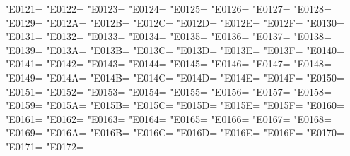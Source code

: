 \XeTeXcharclass"E0121=\KclassCM
\XeTeXcharclass"E0122=\KclassCM
\XeTeXcharclass"E0123=\KclassCM
\XeTeXcharclass"E0124=\KclassCM
\XeTeXcharclass"E0125=\KclassCM
\XeTeXcharclass"E0126=\KclassCM
\XeTeXcharclass"E0127=\KclassCM
\XeTeXcharclass"E0128=\KclassCM
\XeTeXcharclass"E0129=\KclassCM
\XeTeXcharclass"E012A=\KclassCM
\XeTeXcharclass"E012B=\KclassCM
\XeTeXcharclass"E012C=\KclassCM
\XeTeXcharclass"E012D=\KclassCM
\XeTeXcharclass"E012E=\KclassCM
\XeTeXcharclass"E012F=\KclassCM
\XeTeXcharclass"E0130=\KclassCM
\XeTeXcharclass"E0131=\KclassCM
\XeTeXcharclass"E0132=\KclassCM
\XeTeXcharclass"E0133=\KclassCM
\XeTeXcharclass"E0134=\KclassCM
\XeTeXcharclass"E0135=\KclassCM
\XeTeXcharclass"E0136=\KclassCM
\XeTeXcharclass"E0137=\KclassCM
\XeTeXcharclass"E0138=\KclassCM
\XeTeXcharclass"E0139=\KclassCM
\XeTeXcharclass"E013A=\KclassCM
\XeTeXcharclass"E013B=\KclassCM
\XeTeXcharclass"E013C=\KclassCM
\XeTeXcharclass"E013D=\KclassCM
\XeTeXcharclass"E013E=\KclassCM
\XeTeXcharclass"E013F=\KclassCM
\XeTeXcharclass"E0140=\KclassCM
\XeTeXcharclass"E0141=\KclassCM
\XeTeXcharclass"E0142=\KclassCM
\XeTeXcharclass"E0143=\KclassCM
\XeTeXcharclass"E0144=\KclassCM
\XeTeXcharclass"E0145=\KclassCM
\XeTeXcharclass"E0146=\KclassCM
\XeTeXcharclass"E0147=\KclassCM
\XeTeXcharclass"E0148=\KclassCM
\XeTeXcharclass"E0149=\KclassCM
\XeTeXcharclass"E014A=\KclassCM
\XeTeXcharclass"E014B=\KclassCM
\XeTeXcharclass"E014C=\KclassCM
\XeTeXcharclass"E014D=\KclassCM
\XeTeXcharclass"E014E=\KclassCM
\XeTeXcharclass"E014F=\KclassCM
\XeTeXcharclass"E0150=\KclassCM
\XeTeXcharclass"E0151=\KclassCM
\XeTeXcharclass"E0152=\KclassCM
\XeTeXcharclass"E0153=\KclassCM
\XeTeXcharclass"E0154=\KclassCM
\XeTeXcharclass"E0155=\KclassCM
\XeTeXcharclass"E0156=\KclassCM
\XeTeXcharclass"E0157=\KclassCM
\XeTeXcharclass"E0158=\KclassCM
\XeTeXcharclass"E0159=\KclassCM
\XeTeXcharclass"E015A=\KclassCM
\XeTeXcharclass"E015B=\KclassCM
\XeTeXcharclass"E015C=\KclassCM
\XeTeXcharclass"E015D=\KclassCM
\XeTeXcharclass"E015E=\KclassCM
\XeTeXcharclass"E015F=\KclassCM
\XeTeXcharclass"E0160=\KclassCM
\XeTeXcharclass"E0161=\KclassCM
\XeTeXcharclass"E0162=\KclassCM
\XeTeXcharclass"E0163=\KclassCM
\XeTeXcharclass"E0164=\KclassCM
\XeTeXcharclass"E0165=\KclassCM
\XeTeXcharclass"E0166=\KclassCM
\XeTeXcharclass"E0167=\KclassCM
\XeTeXcharclass"E0168=\KclassCM
\XeTeXcharclass"E0169=\KclassCM
\XeTeXcharclass"E016A=\KclassCM
\XeTeXcharclass"E016B=\KclassCM
\XeTeXcharclass"E016C=\KclassCM
\XeTeXcharclass"E016D=\KclassCM
\XeTeXcharclass"E016E=\KclassCM
\XeTeXcharclass"E016F=\KclassCM
\XeTeXcharclass"E0170=\KclassCM
\XeTeXcharclass"E0171=\KclassCM
\XeTeXcharclass"E0172=\KclassCM
